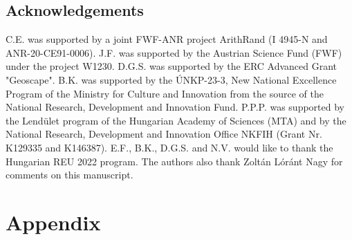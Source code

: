 \documentclass[12pt]{amsart}
\newcommand{\<}{\langle}
\renewcommand{\>}{\rangle}
\numberwithin{equation}{section}
\numberwithin{theorem}{section}
\begin{document}






\subsection*{Acknowledgements}
C.E. was supported by a joint 
 FWF-ANR project ArithRand
 (I 4945-N and ANR-20-CE91-0006).
J.F. was supported by the Austrian Science Fund (FWF) under the project W1230.
D.G.S. was supported by the ERC Advanced Grant "Geoscape". 
B.K. was supported by the ÚNKP-23-3, New National Excellence Program of the Ministry for Culture and Innovation from the source of the National Research, Development and Innovation Fund. P.P.P. was supported by the Lend\"ulet program of the Hungarian Academy of Sciences (MTA) and by the National Research, Development and Innovation Office NKFIH (Grant Nr. K129335 and K146387). E.F., B.K., D.G.S. and N.V. would like to thank the Hungarian REU 2022 program. The authors also thank Zolt\'an L\'or\'ant Nagy for comments on this manuscript.


\printbibliography 

\clearpage
\section{Appendix}
\end{document}
